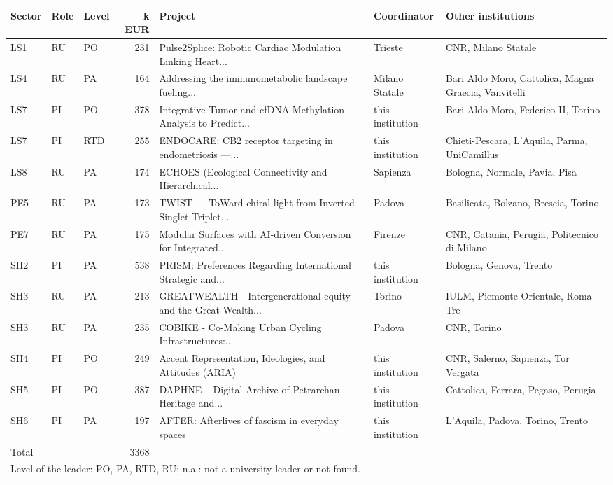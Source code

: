 \documentclass[11pt,a4paper]{article}
\begin{document}
{\footnotesize
\begin{longtable}{lllrp{4.2cm}p{2cm}p{3.2cm}}
\toprule
Sector & Role & Level & k EUR & Project & Coordinator & Other institutions \\
\midrule
\endhead
LS1 & RU & PO & 231 & Pulse2Splice: Robotic Cardiac Modulation Linking Heart... & Trieste & CNR, Milano Statale \\
LS4 & RU & PA & 164 & Addressing the immunometabolic landscape fueling... & Milano Statale & Bari Aldo Moro, Cattolica, Magna Graecia, Vanvitelli \\
LS7 & PI & PO & 378 & Integrative Tumor and cfDNA Methylation Analysis to Predict... & this institution & Bari Aldo Moro, Federico II, Torino \\
LS7 & PI & RTD & 255 & ENDOCARE: CB2 receptor targeting in endometriosis —... & this institution & Chieti-Pescara, L'Aquila, Parma, UniCamillus \\
LS8 & RU & PA & 174 & ECHOES (Ecological Connectivity and Hierarchical... & Sapienza & Bologna, Normale, Pavia, Pisa \\
PE5 & RU & PA & 173 & TWIST — ToWard chiral light from Inverted Singlet-Triplet... & Padova & Basilicata, Bolzano, Brescia, Torino \\
PE7 & RU & PA & 175 & Modular Surfaces with AI-driven Conversion for Integrated... & Firenze & CNR, Catania, Perugia, Politecnico di Milano \\
SH2 & PI & PA & 538 & PRISM: Preferences Regarding International Strategic and... & this institution & Bologna, Genova, Trento \\
SH3 & RU & PA & 213 & GREATWEALTH - Intergenerational equity and the Great Wealth... & Torino & IULM, Piemonte Orientale, Roma Tre \\
SH3 & RU & PA & 235 & COBIKE - Co-Making Urban Cycling Infrastructures:... & Padova & CNR, Torino \\
SH4 & PI & PO & 249 & Accent Representation, Ideologies, and Attitudes (ARIA) & this institution & CNR, Salerno, Sapienza, Tor Vergata \\
SH5 & PI & PO & 387 & DAPHNE – Digital Archive of Petrarchan Heritage and... & this institution & Cattolica, Ferrara, Pegaso, Perugia \\
SH6 & PI & PA & 197 & AFTER: Afterlives of fascism in everyday spaces & this institution & L'Aquila, Padova, Torino, Trento \\
\midrule
Total &  &  & 3368 &  &  &  \\
\bottomrule
\multicolumn{7}{l}{\footnotesize Level of the leader: PO, PA, RTD, RU; n.a.: not a university leader or not found.} \\
\end{longtable}
}
\end{document}
